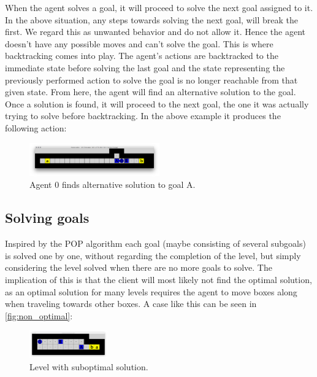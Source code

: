\documentclass[Main]{subfiles}
\begin{document}
When the agent solves a goal, it will proceed to solve the next goal assigned to it. In the above situation, any steps towards solving the next goal, will break the first. We regard this as unwanted behavior and do not allow it. Hence the agent doesn't have any possible moves and can't solve the goal. This is where backtracking comes into play. The agent's actions are backtracked to the immediate state before solving the last goal and the state representing the previously performed action to solve the goal is no longer reachable from that given state. From here, the agent will find an alternative solution to the goal. Once a solution is found, it will proceed to the next goal, the one it was actually trying to solve before backtracking. In the above example it produces the following action:
\begin{figure}[h!]
    \centering
    \includegraphics[width=0.5\textwidth]{backtrack2.png}
    \caption{Agent 0 finds alternative solution to goal A.}
    \label{fig:backtrack2}
\end{figure}



\subsection{Solving goals}

Inspired by the POP algorithm each goal (maybe consisting of several subgoals) is solved one by one, without regarding the completion of the level, but simply considering the level solved when there are no more goals to solve. The implication of this is that the client will most likely not find the optimal solution, as an optimal solution for many levels requires the agent to move boxes along when traveling towards other boxes. A case like this can be seen in \autoref{fig:non_optimal}:
\begin{figure}[h!]
    \centering
    \includegraphics[width=0.3\textwidth]{non_optimal.png}
    \caption{Level with suboptimal solution.}
    \label{fig:non_optimal}
\end{figure}
\end{document}
